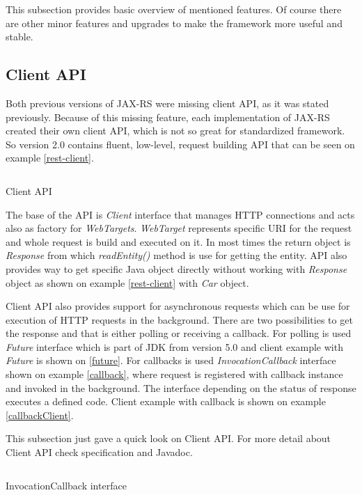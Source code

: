 \documentclass[12pt,final,oneside]{fithesis2}
\begin{document}
This subsection provides basic overview of mentioned features. Of course there are other minor features and upgrades to make the framework more useful and stable.

\subsection*{Client API}\label{client-api}
Both previous versions of JAX-RS were missing client API, as it was stated previously. Because of this missing feature, each implementation of JAX-RS created their own client API, which is not so great for standardized framework. So version 2.0 contains fluent, low-level, request building API that can be seen on example \ref{rest-client}. 

\begin{listing}[ht]
	\inputminted[]{java}{sources/client.java}
	\caption{Client API}
	\label{rest-client}
\end{listing}

The base of the API is \textit{Client} interface that manages HTTP connections and acts also as factory for \textit{WebTargets}. \textit{WebTarget} represents specific URI for the request and whole request is build and executed on it. In most times the return object is \textit{Response} from which \textit{readEntity()} method is use for getting the entity. API also provides way to get specific Java object directly without working with \textit{Response} object as shown on example \ref{rest-client} with \textit{Car} object.

Client API also provides support for asynchronous requests which can be use for execution of HTTP requests in the background. There are two possibilities to get the response and that is either polling or receiving a callback. For polling is used \textit{Future} interface which is part of JDK from version 5.0 and client example with \textit{Future} is shown on \ref{future}. For callbacks is used \textit{InvocationCallback} interface shown on example \ref{callback}, where request is registered with callback instance and invoked in the background. The interface depending on the status of response executes a defined code\cite{jax-rs-2.0-new}\cite{jax-rs-2.0}. Client example with callback is shown on example \ref{callbackClient}.

This subsection just gave a quick look on Client API. For more detail about Client API check specification and Javadoc.

\begin{listing}[ht]
	\inputminted[]{java}{sources/callback.java}
	\caption{InvocationCallback interface}
	\label{callback}
\end{listing}
\end{document}
